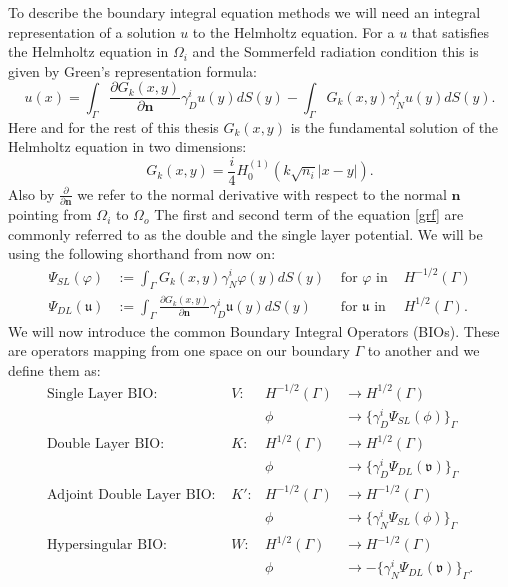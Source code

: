 \documentclass[a4paper, oneside]{discothesis}
\begin{document}
To describe the boundary integral equation methods we will need an integral representation of a solution $u$ to the Helmholtz equation.
For a $u$ that satisfies the Helmholtz equation in $\Omega_i$ and the Sommerfeld radiation condition this is given by Green's representation formula:
\begin{equation}
	u(x) = \int_\Gamma \frac{\partial G_k(x,y)}{\partial \mathbf{n}}\gamma^i_Du(y)dS(y) - \int_\Gamma G_k(x,y)\gamma^i_Nu(y)dS(y). \label{grf}
\end{equation}
Here and for the rest of this thesis $G_k(x,y)$ is the fundamental solution of the Helmholtz equation in two dimensions:
\begin{equation}
	G_k(x,y) = \frac{i}{4}H_0^{(1)}(k\sqrt{n_i}|x-y|). \label{fs}
\end{equation}
Also by $\frac{\partial }{\partial \mathbf{n}}$ we refer to the normal derivative with respect to the normal $\mathbf{n}$ pointing from $\Omega_i$ to $\Omega_o$
The first and second term of the equation \ref{grf} are commonly referred to as the double and the single layer potential. 
We will be using the following shorthand from now on:
\begin{align}
	\Psi_{SL}(\varphi) &:= \int_\Gamma G_k(x,y)\gamma^i_N \varphi(y)dS(y) &\text{ for } \varphi \text{ in } & H^{-1/2}(\Gamma) \\
	\Psi_{DL}(\mathfrak{u}) &:= \int_\Gamma \frac{\partial G_k(x,y)}{\partial \mathbf{n}}\gamma^i_D \mathfrak{u}(y)dS(y) &\text{ for } \mathfrak{u}\text{ in } & H^{1/2}(\Gamma) .
\end{align}
We will now introduce the common Boundary Integral Operators (BIOs). 
These are operators mapping from one space on our boundary $\Gamma$ to another and we define them as:
\begin{align}
	\text{Single Layer BIO: }& V: &H^{-1/2}(\Gamma)& \longrightarrow H^{1/2}(\Gamma)\\
							 &	& \phi & \longrightarrow \{\gamma^i_D \Psi_{SL}(\phi)\}_{\Gamma} \nonumber \\
	\text{Double Layer BIO: }& K: &H^{1/2}(\Gamma)& \longrightarrow H^{1/2}(\Gamma)\\
							 &	& \phi &  \longrightarrow \{\gamma^i_D \Psi_{DL}(\mathfrak{v})\}_{\Gamma} \nonumber\\
	\text{Adjoint Double Layer BIO: }& K': &H^{-1/2}(\Gamma)& \longrightarrow H^{-1/2}(\Gamma)\\
									 &	& \phi &  \longrightarrow  \{\gamma^i_N \Psi_{SL}(\phi)\}_{\Gamma} \nonumber\\
	\text{Hypersingular BIO: }& W: &H^{1/2}(\Gamma)& \longrightarrow H^{-1/2}(\Gamma)\\
							  &	& \phi &  \longrightarrow  -\{\gamma^i_N \Psi_{DL}(\mathfrak{v})\}_{\Gamma}.\nonumber
\end{align}
\end{document}
